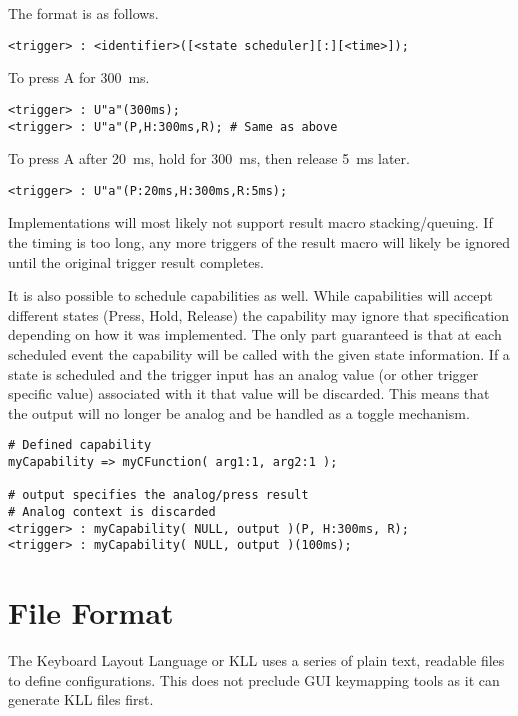 \documentclass{kiibohd-template}
\begin{document}
The format is as follows.
\begin{lstlisting}
<trigger> : <identifier>([<state scheduler][:][<time>]);
\end{lstlisting}

To press A for 300~ms.

\begin{lstlisting}
<trigger> : U"a"(300ms);
<trigger> : U"a"(P,H:300ms,R); # Same as above
\end{lstlisting}

To press A after 20~ms, hold for 300~ms, then release 5~ms later.

\begin{lstlisting}
<trigger> : U"a"(P:20ms,H:300ms,R:5ms);
\end{lstlisting}

Implementations will most likely not support result macro stacking/queuing.
If the timing is too long, any more triggers of the result macro will likely be ignored until the original trigger result completes.

It is also possible to schedule capabilities as well.
While capabilities will accept different states (Press, Hold, Release) the capability may ignore that specification depending on how it was implemented.
The only part guaranteed is that at each scheduled event the capability will be called with the given state information.
If a state is scheduled and the trigger input has an analog value (or other trigger specific value) associated with it that value will be discarded.
This means that the output will no longer be analog and be handled as a toggle mechanism.

\begin{lstlisting}
# Defined capability
myCapability => myCFunction( arg1:1, arg2:1 );

# output specifies the analog/press result
# Analog context is discarded
<trigger> : myCapability( NULL, output )(P, H:300ms, R);
<trigger> : myCapability( NULL, output )(100ms);
\end{lstlisting}


\chapter{File Format}

The Keyboard Layout Language or KLL uses a series of plain text, readable files to define configurations.
This does not preclude GUI keymapping tools as it can generate KLL files first.
\end{document}
